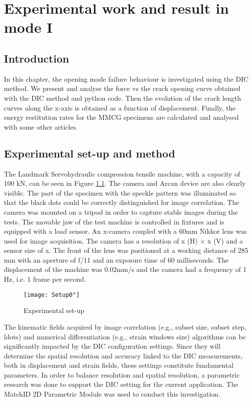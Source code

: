 \chapter{Experimental work and result in mode I}
\label{Chapter3}

\section{Introduction}

In this chapter, the opening mode failure behaviour is investigated using the DIC method. We present and analyse the force vs the crack opening curve obtained with the DIC method and python code.  Then the evolution of the crack length curves along the x-axis is obtained as a function of displacement. Finally, the energy restitution rates for the MMCG specimens are calculated and analysed with some other articles.

\section{Experimental set-up and method}

The Landmark Servohydraulic compression tensile machine, with a capacity of 100 kN, can be seen in Figure \ref{fig:Setup0°}. The camera and Arcan device are also clearly visible. The part of the specimen with the speckle pattern was illuminated so that the black dots could be correctly distinguished for image correlation. The camera was mounted on a tripod in order to capture stable images during the tests. The movable jaw of the test machine is controlled in fixtures and is equipped with a load sensor.
An x-camera coupled with a 60mm Nikkor lens was used for image acquisition. The camera has a resolution of x (H) × x (V) and a sensor size of x. The front of the lens was positioned at a working distance of 285 mm with an aperture of f/11 and an exposure time of 60 milliseconds. The displacement of the machine was 0.02mm/s and the camera had a frequency of 1 Hz, i.e. 1 frame per second.

\begin{figure}[htp]
	\centering
	\texttt{[image: Setup0°]}
	\caption{Experimental set-up}
	\label{fig:Setup0°}
\end{figure}

The kinematic fields acquired by image correlation (e.g., subset size, subset step, ldots) and numerical differentiation (e.g., strain windows size) algorithms can be significantly impacted by the DIC configuration settings. Since they will determine the spatial resolution and accuracy linked to the DIC measurements, both in displacement and strain fields, these settings constitute fundamental parameters.  In order to balance resolution and spatial resolution, a parametric research was done to support the DIC setting for the current application. The MatchID 2D Parametric Module was used to conduct this investigation.

